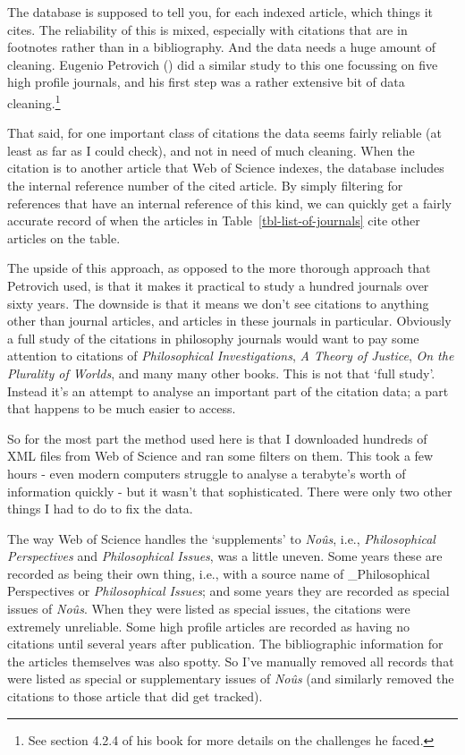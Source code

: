 \documentclass[
  10pt,
  letterpaper,
  DIV=11,
  numbers=noendperiod,
  twoside]{scrartcl}
\begin{document}
The database is supposed to tell you, for each indexed article, which
things it cites. The reliability of this is mixed, especially with
citations that are in footnotes rather than in a bibliography. And the
data needs a huge amount of cleaning. Eugenio Petrovich
() did a similar study to this one
focussing on five high profile journals, and his first step was a rather
extensive bit of data cleaning.\footnote{See section 4.2.4 of his book
  for more details on the challenges he faced.}

That said, for one important class of citations the data seems fairly
reliable (at least as far as I could check), and not in need of much
cleaning. When the citation is to another article that Web of Science
indexes, the database includes the internal reference number of the
cited article. By simply filtering for references that have an internal
reference of this kind, we can quickly get a fairly accurate record of
when the articles in Table~\ref{tbl-list-of-journals} cite other
articles on the table.

The upside of this approach, as opposed to the more thorough approach
that Petrovich used, is that it makes it practical to study a hundred
journals over sixty years. The downside is that it means we don't see
citations to anything other than journal articles, and articles in these
journals in particular. Obviously a full study of the citations in
philosophy journals would want to pay some attention to citations of
\emph{Philosophical Investigations}, \emph{A Theory of Justice},
\emph{On the Plurality of Worlds}, and many many other books. This is
not that `full study'. Instead it's an attempt to analyse an important
part of the citation data; a part that happens to be much easier to
access.

So for the most part the method used here is that I downloaded hundreds
of XML files from Web of Science and ran some filters on them. This took
a few hours - even modern computers struggle to analyse a terabyte's
worth of information quickly - but it wasn't that sophisticated. There
were only two other things I had to do to fix the data.

The way Web of Science handles the `supplements' to \emph{Noûs}, i.e.,
\emph{Philosophical Perspectives} and \emph{Philosophical Issues}, was a
little uneven. Some years these are recorded as being their own thing,
i.e., with a source name of \_Philosophical Perspectives or
\emph{Philosophical Issues}; and some years they are recorded as special
issues of \emph{Noûs}. When they were listed as special issues, the
citations were extremely unreliable. Some high profile articles are
recorded as having no citations until several years after publication.
The bibliographic information for the articles themselves was also
spotty. So I've manually removed all records that were listed as special
or supplementary issues of \emph{Noûs} (and similarly removed the
citations to those article that did get tracked).
\end{document}

